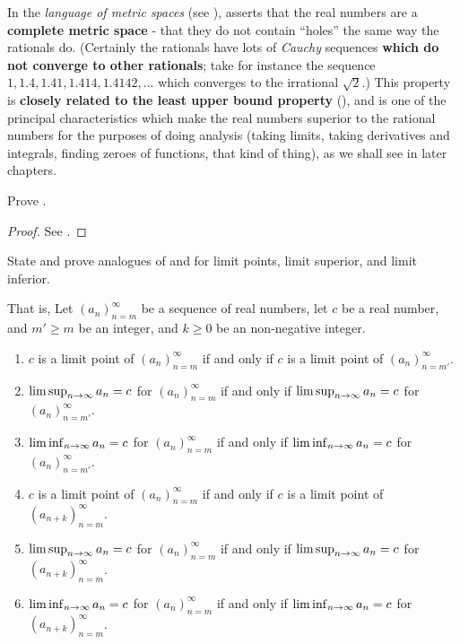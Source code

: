\begin{remark} \label{remark 6.4.20}
In the \emph{language of metric spaces} (see ),  asserts that the real numbers are a \textbf{complete metric space}
- that they do not contain ``holes'' the same way the rationals do.
(Certainly the rationals have lots of \emph{Cauchy} sequences \textbf{which do not converge to other rationals};
take for instance the sequence \(1, 1.4, 1.41, 1.414, 1.4142,...\) which converges to the irrational \(\sqrt{2}\).) This property is \textbf{closely related to the least upper bound property} (),
and is one of the principal characteristics which make the real numbers superior to the rational numbers for the purposes of doing analysis
(taking limits, taking derivatives and integrals, finding zeroes of functions, that kind of thing),
as we shall see in later chapters.
\end{remark}

\exercisesection

\begin{exercise} \label{exercise 6.4.1}
Prove .
\end{exercise}

\begin{proof}
See .
\end{proof}

\begin{exercise} \label{exercise 6.4.2}
State and prove analogues of  and  for limit points, limit superior, and limit inferior.

That is, Let \((a_n)_{n=m}^{\infty}\) be a sequence of real numbers, let \(c\) be a real number, and \(m' \ge m\) be an integer, and \(k \ge 0\) be an non-negative integer. 
\begin{enumerate}
\item \(c\) is a limit point of \((a_n)_{n=m}^{\infty}\) if and only if \(c\) is a limit point of \((a_n)_{n=m'}^{\infty}\).
\item \(\limsup_{n \to \infty} a_n = c\) for \((a_n)_{n = m}^{\infty}\) if and only if \(\limsup_{n \to \infty} a_n = c\) for \((a_n)_{n = m'}^{\infty}\).
\item \(\liminf_{n \to \infty} a_n = c\) for \((a_n)_{n = m}^{\infty}\) if and only if \(\liminf_{n \to \infty} a_n = c\) for \((a_n)_{n = m'}^{\infty}\).
\item \(c\) is a limit point of \((a_n)_{n = m}^{\infty}\) if and only if \(c\) is a limit point of \((a_{n + k})_{n = m}^{\infty}\).
\item \(\limsup_{n \to \infty} a_n = c\) for \((a_n)_{n = m}^{\infty}\) if and only if \(\limsup_{n \to \infty} a_n = c\) for \((a_{n + k})_{n = m}^{\infty}\).
\item \(\liminf_{n \to \infty} a_n = c\) for \((a_n)_{n = m}^{\infty}\) if and only if \(\liminf_{n \to \infty} a_n = c\) for \((a_{n + k})_{n = m}^{\infty}\).
\end{enumerate}
\end{exercise}

